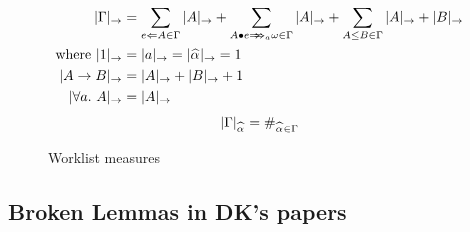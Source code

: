 \begin{figure}[h!]
\begin{gather*}
\begin{aligned}
    |\Gm|_\to &= \sum_{e\Lto A\in\Gm}|A|_\to + \sum_{\appInfAlg{A}{e}\in\Gm}|A|_\to +
        \sum_{A\le B\in\Gm} |A|_\to + |B|_\to\\
    \text{where } |1|_\to &= |a|_\to = |\al|_\to = 1\\
        |A\to B|_\to &= |A|_\to + |B|_\to + 1\\
        |\all A|_\to &= |A|_\to
    \end{aligned}
    \end{gather*}
    \hfill \framebox{$|\Gm|_{\al}$} \hfill  {}
    \begin{gather*}
    \begin{aligned}
    |\Gm|_{\al} &= \#_{\al\in\Gm}\\
    \end{aligned}
\end{gather*}
\caption{Worklist measures}
\label{fig:measures}
\end{figure}

\subsection{Broken Lemmas in DK's papers}
\label{appendix:false_lemmas}

